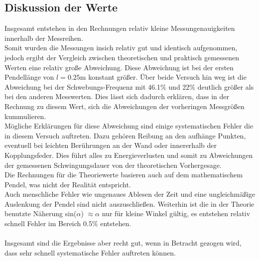     \subsection{Diskussion der Werte}

        \noindent Insgesamt entstehen in den Rechnungen relativ kleine Messungenauigkeiten innerhalb der Messreihen.\\ Somit wurden die 
        Messungen insich relativ gut und identisch aufgenommen, jedoch ergibt der Vergleich zwischen theoretischen und praktisch 
        gemessenen Werten eine relativ große Abweichung. Diese Abweichung ist bei der ersten Pendellänge von $l = 0.25 \si{\meter}$ 
        konstant größer. Über beide Versuch hin weg ist die Abweichung bei der Schwebungs-Frequenz mit 46.1\% und 22\% deutlich größer als bei 
        den anderen Messwerten. Dies lässt sich dadurch erklären, dass in der Rechnung zu diesem Wert, sich die Abweichungen der vorheringen 
        Messgrößen kummulieren.\\

        \noindent Mögliche Erklärungen für diese Abweichung sind einige systematischen Fehler die in diesem Versuch auftreten. Dazu gehören 
        Reibung an den aufhänge Punkten, eventuell bei leichten Berührungen an der Wand oder innererhalb der Kopplungsfeder. Dies führt 
        alles zu Energieverlusten und somit zu Abweichungen der gemessenen Schwingungsdauer von der theoretischen Vorhergesage.\\
        Die Rechnungen für die Theoriewerte basieren auch auf dem mathematischem Pendel, was nicht der Realität entspricht.\\
        Auch menschliche Fehler wie ungenaues Ablesen der Zeit und eine ungleichmäßige Auslenkung der Pendel sind nicht auszuschließen.
        Weiterhin ist die in der Theorie benutzte Näherung sin($\alpha$) $\approx \alpha$ nur für kleine Winkel gültig, es entstehen 
        relativ schnell Fehler im Bereich 0.5\% entstehen.\\\\

        \noindent Insgesamt sind die Ergebnisse aber recht gut, wenn in Betracht gezogen wird, dass sehr schnell systematische Fehler auftreten können.
\newpage
